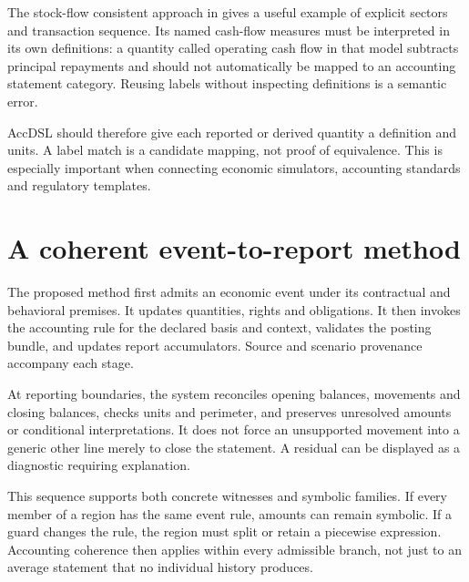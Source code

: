 The stock-flow consistent approach in \citet{caiani2016} gives a useful example of explicit sectors and transaction sequence. Its named cash-flow measures must be interpreted in its own definitions: a quantity called operating cash flow in that model subtracts principal repayments and should not automatically be mapped to an accounting statement category. Reusing labels without inspecting definitions is a semantic error.

AccDSL should therefore give each reported or derived quantity a definition and units. A label match is a candidate mapping, not proof of equivalence. This is especially important when connecting economic simulators, accounting standards and regulatory templates.

\section{A coherent event-to-report method}
The proposed method first admits an economic event under its contractual and behavioral premises. It updates quantities, rights and obligations. It then invokes the accounting rule for the declared basis and context, validates the posting bundle, and updates report accumulators. Source and scenario provenance accompany each stage.

At reporting boundaries, the system reconciles opening balances, movements and closing balances, checks units and perimeter, and preserves unresolved amounts or conditional interpretations. It does not force an unsupported movement into a generic other line merely to close the statement. A residual can be displayed as a diagnostic requiring explanation.

This sequence supports both concrete witnesses and symbolic families. If every member of a region has the same event rule, amounts can remain symbolic. If a guard changes the rule, the region must split or retain a piecewise expression. Accounting coherence then applies within every admissible branch, not just to an average statement that no individual history produces.
